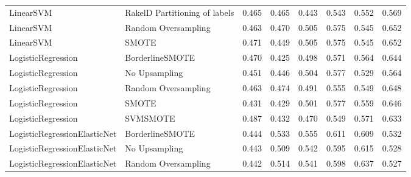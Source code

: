 \begin{tabular}{llllllll}
                      LinearSVM & RakelD Partitioning of labels & 0.465 &                     0.465 &                 0.443 &                  0.543 &                                   0.552 &     0.569 \\
                      LinearSVM &           Random Oversampling & 0.463 &                     0.470 &                 0.505 &                  0.575 &                                   0.545 &     0.652 \\
                      LinearSVM &                         SMOTE & 0.471 &                     0.449 &                 0.505 &                  0.575 &                                   0.545 &     0.652 \\
             LogisticRegression &               BorderlineSMOTE & 0.470 &                     0.425 &                 0.498 &                  0.571 &                                   0.564 &     0.644 \\
             LogisticRegression &                 No Upsampling & 0.451 &                     0.446 &                 0.504 &                  0.577 &                                   0.529 &     0.564 \\
             LogisticRegression &           Random Oversampling & 0.463 &                     0.474 &                 0.491 &                  0.555 &                                   0.549 &     0.648 \\
             LogisticRegression &                         SMOTE & 0.431 &                     0.429 &                 0.501 &                  0.577 &                                   0.559 &     0.646 \\
             LogisticRegression &                      SVMSMOTE & 0.487 &                     0.432 &                 0.470 &                  0.549 &                                   0.571 &     0.633 \\
   LogisticRegressionElasticNet &               BorderlineSMOTE & 0.444 &                     0.533 &                 0.555 &                  0.611 &                                   0.609 &     0.532 \\
   LogisticRegressionElasticNet &                 No Upsampling & 0.443 &                     0.509 &                 0.542 &                  0.595 &                                   0.615 &     0.528 \\
   LogisticRegressionElasticNet &           Random Oversampling & 0.442 &                     0.514 &                 0.541 &                  0.598 &                                   0.637 &     0.527 \\

\end{tabular}

